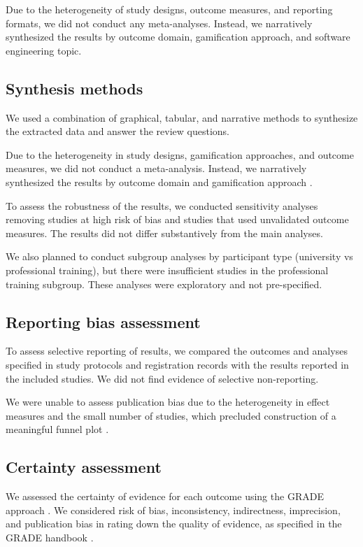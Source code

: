 \documentclass[
	hf,
	]{ceurart}
\begin{document}
		Due to the heterogeneity of study designs, outcome measures, and reporting formats, we did not conduct any meta-analyses. Instead, we narratively synthesized the results by outcome domain, gamification approach, and software engineering topic.
		
		\subsection{Synthesis methods}
		
		We used a combination of graphical, tabular, and narrative methods to synthesize the extracted data and answer the review questions.
		
		Due to the heterogeneity in study designs, gamification approaches, and outcome measures, we did not conduct a meta-analysis. Instead, we narratively synthesized the results by outcome domain and gamification approach \cite{info:doi/10.2196/18644}. 
		
		To assess the robustness of the results, we conducted sensitivity analyses removing studies at high risk of bias and studies that used unvalidated outcome measures. The results did not differ substantively from the main analyses.
		
		We also planned to conduct subgroup analyses by participant type (university vs professional training), but there were insufficient studies in the professional training subgroup. These analyses were exploratory and not pre-specified.
		
		\subsection{Reporting bias assessment}
		
		To assess selective reporting of results, we compared the outcomes and analyses specified in study protocols and registration records with the results reported in the included studies. We did not find evidence of selective non-reporting. 
		
		We were unable to assess publication bias due to the heterogeneity in effect measures and the small number of studies, which precluded construction of a meaningful funnel plot \cite{Sterne2011}.
		
		\subsection{Certainty assessment}
		
		We assessed the certainty of evidence for each outcome using the GRADE approach \cite{Guyatt2008}. We considered risk of bias, inconsistency, indirectness, imprecision, and publication bias in rating down the quality of evidence, as specified in the GRADE handbook \cite{GRADE}. 
		
\end{document}

